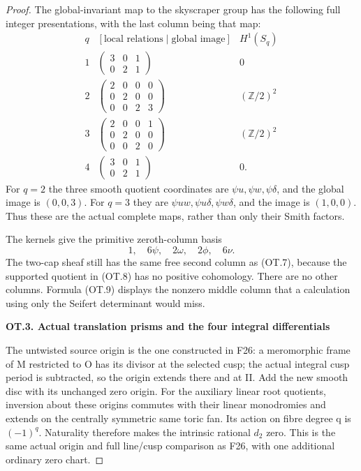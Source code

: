 \begin{proof}
The global-invariant map to the skyscraper group has the following full
integer presentations, with the last column being that map:
\[
\begin{array}{c|c|c}
q&[\text{local relations}\mid\text{global image}]&H^1(S_q)\\\hline
1&\begin{pmatrix}3&0&1\\0&2&1\end{pmatrix}&0\\[3pt]
2&\begin{pmatrix}2&0&0&0\\0&2&0&0\\0&0&2&3\end{pmatrix}&(\mathbb Z/2)^2\\[3pt]
3&\begin{pmatrix}2&0&0&1\\0&2&0&0\\0&0&2&0\end{pmatrix}&(\mathbb Z/2)^2\\[3pt]
4&\begin{pmatrix}3&0&1\\0&2&1\end{pmatrix}&0.
\end{array}                                                    \tag{OT.9}
\]
For \(q=2\) the three smooth quotient coordinates are \(\psi u,\psi w,\psi\delta\), and the global image is \((0,0,3)\). For \(q=3\) they are \(\psi uw,\psi u\delta,\psi w\delta\), and the image is \((1,0,0)\). Thus these are the
actual complete maps, rather than only their Smith factors.

The kernels give the primitive zeroth-column basis
\[
                    1,\quad6\psi,\quad2\omega,
                          \quad2\phi,\quad6\nu.          \tag{OT.10}
\]
The two-cap sheaf still has the same free second column as (OT.7), because
the supported quotient in (OT.8) has no positive cohomology. There are no
other columns. Formula (OT.9) displays the nonzero middle column that a
calculation using only the Seifert determinant would miss.

\par

\medskip\noindent\textbf{OT.3. Actual translation prisms and the four integral differentials}

\par\nobreak

The untwisted source origin is the one constructed in F26: a meromorphic
frame of M restricted to O has its divisor at the selected cusp; the
actual integral cusp period is subtracted, so the origin extends there
and at II. Add the new smooth disc with its unchanged zero origin.
For the auxiliary linear root quotients, inversion about these origins
commutes with their linear monodromies and extends on the centrally
symmetric same toric fan. Its action on fibre degree q is \((-1)^q\).
Naturality therefore makes the intrinsic rational \(d_2\) zero. This is the
same actual origin and full line/cusp comparison as F26, with one
additional ordinary zero chart.


\end{proof}
